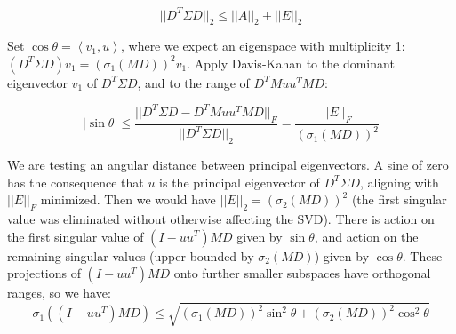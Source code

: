\documentclass{article}
\begin{document}
$$
||D^T \Sigma D||_2 \le ||A||_2 + ||E||_2
$$

Set $\cos\theta = \left< v_1, u \right>$, where we expect an eigenspace with multiplicity 1: $(D^T \Sigma D) v_1 = (\sigma_1(MD))^2 v_1$. Apply Davis-Kahan to the dominant eigenvector $v_1$ of $D^T \Sigma D$, and to the range of $D^TM uu^T MD$:

$$
|\sin\theta| \le \frac{||D^T \Sigma D - D^T M u u^T M D||_F}{||D^T \Sigma D||_2} = \frac{||E||_F}{(\sigma_1(MD))^2}
$$






We are testing an angular distance between principal eigenvectors. A sine of zero has the consequence that $u$ is the principal eigenvector of $D^T \Sigma D$, aligning with $||E||_F$ minimized. Then we would have $||E||_2 = (\sigma_2(MD))^2$ (the first singular value was eliminated without otherwise affecting the SVD). There is action on the first singular value of $(I-uu^T)MD$ given by $\sin\theta$, and action on the remaining singular values (upper-bounded by $\sigma_2(MD)$) given by $\cos\theta$. These projections of $(I-uu^T)MD$ onto further smaller subspaces have orthogonal ranges, so we have: $$\sigma_1((I-uu^T)MD) \le \sqrt{(\sigma_1(MD))^2 \sin^2\theta + (\sigma_2(MD))^2 \cos^2\theta}$$
\end{document}
